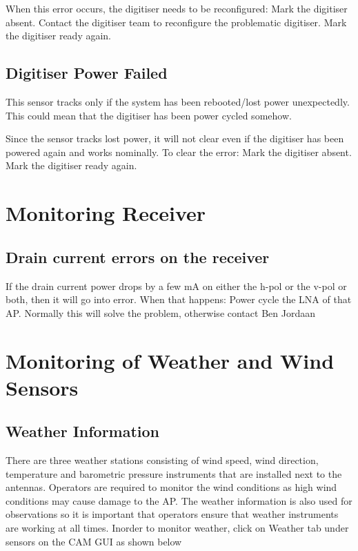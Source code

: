 When this error occurs, the digitiser needs to be reconfigured:
Mark the digitiser absent.
Contact the digitiser team to reconfigure the problematic digitiser.
Mark the digitiser ready again.

\subsection{ Digitiser Power Failed}
This sensor tracks only if the system has been rebooted/lost power unexpectedly. This could mean that the digitiser has been power cycled somehow.

Since the sensor tracks lost power, it will not clear even if the digitiser has been powered again and works nominally. To clear the error:
Mark the digitiser absent.
Mark the digitiser ready again. 
\section{ Monitoring Receiver }
\subsection{ Drain current errors on the receiver}
If the drain current power drops by a few mA on either the h-pol or the v-pol or both, then it will go into error. When that happens:
Power cycle the LNA of that AP.
Normally this will solve the problem, otherwise contact Ben Jordaan
\section{ Monitoring of Weather and Wind Sensors}
\subsection{ Weather Information}
There are three weather stations consisting of wind speed, wind direction, temperature and barometric pressure instruments that are installed next to the antennas. Operators are required to monitor the wind conditions as high wind conditions may cause damage to the AP.  The weather information is also used for observations so it is important that operators ensure that weather instruments are working at all times. Inorder to monitor weather, click on Weather tab under sensors on the CAM GUI as shown below



